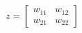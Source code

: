 \documentclass[preview]{standalone}
\begin{document}
\begin{align*}
z = \begin{bmatrix} w_{11} & w_{12} \\ w_{21} & w_{22} \end{bmatrix}
\end{align*}
\end{document}

